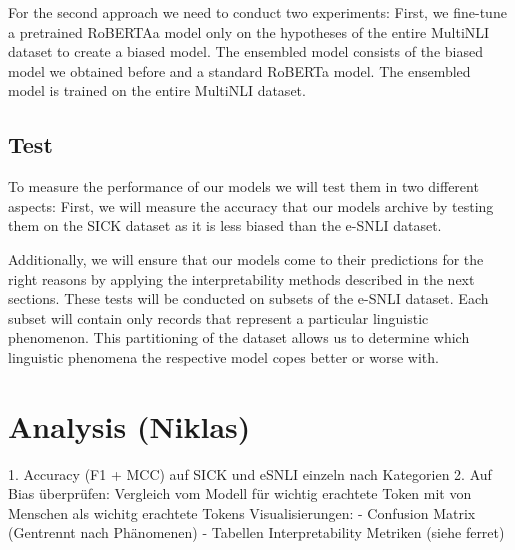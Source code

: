 \documentclass[12pt,a4paper]{article}
\begin{document}
For the second approach we need to conduct two experiments: First, we fine-tune a pretrained RoBERTAa model only on the hypotheses of the entire MultiNLI dataset to create a biased model. The ensembled model consists of the biased model we obtained before and a standard RoBERTa model. The ensembled model is trained on the entire MultiNLI dataset.

\subsection{Test}
To measure the performance of our models we will test them in two different aspects: First, we will measure the accuracy that our models archive by testing them on the SICK dataset as it is less biased than the e-SNLI dataset.

Additionally, we will ensure that our models come to their predictions for the right reasons by applying the interpretability methods described in the next sections. These tests will be conducted on subsets of the e-SNLI dataset. Each subset will contain only records that represent a particular linguistic phenomenon. This partitioning of the dataset allows us to determine which linguistic phenomena the respective model copes better or worse with.

\section{Analysis (Niklas)}
1. Accuracy (F1 + MCC) auf SICK und eSNLI einzeln nach Kategorien
2. Auf Bias überprüfen: Vergleich vom Modell für wichtig erachtete Token mit von Menschen als wichitg erachtete Tokens
Visualisierungen:
- Confusion Matrix (Gentrennt nach Phänomenen)
- Tabellen Interpretability Metriken (siehe ferret)


\printbibliography
\end{document}
